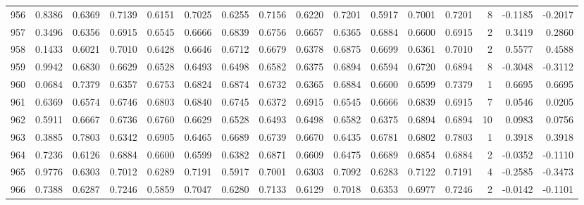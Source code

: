\begin{tabular}{lrrrrrrrrrrrrrrr}
956 &      0.8386 &  0.6369 &  0.7139 &  0.6151 &  0.7025 &  0.6255 &  0.7156 &  0.6220 &  0.7201 &  0.5917 &   0.7001 &     0.7201 &      8 &                   -0.1185 &                    -0.2017 \\
957 &      0.3496 &  0.6356 &  0.6915 &  0.6545 &  0.6666 &  0.6839 &  0.6756 &  0.6657 &  0.6365 &  0.6884 &   0.6600 &     0.6915 &      2 &                    0.3419 &                     0.2860 \\
958 &      0.1433 &  0.6021 &  0.7010 &  0.6428 &  0.6646 &  0.6712 &  0.6679 &  0.6378 &  0.6875 &  0.6699 &   0.6361 &     0.7010 &      2 &                    0.5577 &                     0.4588 \\
959 &      0.9942 &  0.6830 &  0.6629 &  0.6528 &  0.6493 &  0.6498 &  0.6582 &  0.6375 &  0.6894 &  0.6594 &   0.6720 &     0.6894 &      8 &                   -0.3048 &                    -0.3112 \\
960 &      0.0684 &  0.7379 &  0.6357 &  0.6753 &  0.6824 &  0.6874 &  0.6732 &  0.6365 &  0.6884 &  0.6600 &   0.6599 &     0.7379 &      1 &                    0.6695 &                     0.6695 \\
961 &      0.6369 &  0.6574 &  0.6746 &  0.6803 &  0.6840 &  0.6745 &  0.6372 &  0.6915 &  0.6545 &  0.6666 &   0.6839 &     0.6915 &      7 &                    0.0546 &                     0.0205 \\
962 &      0.5911 &  0.6667 &  0.6736 &  0.6760 &  0.6629 &  0.6528 &  0.6493 &  0.6498 &  0.6582 &  0.6375 &   0.6894 &     0.6894 &     10 &                    0.0983 &                     0.0756 \\
963 &      0.3885 &  0.7803 &  0.6342 &  0.6905 &  0.6465 &  0.6689 &  0.6739 &  0.6670 &  0.6435 &  0.6781 &   0.6802 &     0.7803 &      1 &                    0.3918 &                     0.3918 \\
964 &      0.7236 &  0.6126 &  0.6884 &  0.6600 &  0.6599 &  0.6382 &  0.6871 &  0.6609 &  0.6475 &  0.6689 &   0.6854 &     0.6884 &      2 &                   -0.0352 &                    -0.1110 \\
965 &      0.9776 &  0.6303 &  0.7012 &  0.6289 &  0.7191 &  0.5917 &  0.7001 &  0.6303 &  0.7092 &  0.6283 &   0.7122 &     0.7191 &      4 &                   -0.2585 &                    -0.3473 \\
966 &      0.7388 &  0.6287 &  0.7246 &  0.5859 &  0.7047 &  0.6280 &  0.7133 &  0.6129 &  0.7018 &  0.6353 &   0.6977 &     0.7246 &      2 &                   -0.0142 &                    -0.1101 \\

\end{tabular}
